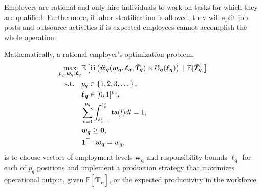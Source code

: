 \documentclass[hidelinks, nonatbib]{elsarticle}
\begin{document}
\begin{axiom}
    \label{era}
    Employers are rational and only hire individuals to work on tasks for which they are qualified. Furthermore, if labor stratification is allowed, they will split job posts and outsource activities if is expected employees cannot accomplish the whole operation.

    Mathematically, a rational employer's optimization problem,
    \begin{align}
        \max_{
            p_q,
            \boldsymbol{w_q},
            \boldsymbol{\ell_q}
        }
            &
            \mathbb{E}\left[
                \mho\left(
                    \boldsymbol{\ddot{w}_{q}}(
                        \boldsymbol{w_{q}},
                        \boldsymbol{\ell_{q}},
                        \boldsymbol{\tilde{T}_{q}}
                    )
                    \times
                    \boldsymbol{
                        \mho_q
                    }(
                        \boldsymbol{\ell_q}
                    )
                \right)
                \
                |
                \
                \mathbb{E}[
                    \boldsymbol{\tilde{T}_q}
                ]
            \right]
            \\
            \text{s.t.}
            \quad
            &
            p_q \in \left\{1, 2, 3, \dots\right\}
            ,
            \\
            &
            \boldsymbol{\ell_q} \in [0,1] ^ {p_q}
            ,
            \\
            &
            \sum_{v=1}^{p_q}{
                \int_{
                    \ell_{v-1}^{q}
                }^{
                    \ell_{v}^{q}
                }
                \text{ta}(l)dl
            }
            =
            1
            ,
            \\
            &
            \boldsymbol{w_{q}} \geq \boldsymbol{0}
            ,
            \\
            &
            \boldsymbol{1} ^ {\top}
            \cdot
            \boldsymbol{w_q}
            =
            w_q
            ,
    \end{align}
    is to choose vectors of employment levels $\boldsymbol{w_q}$ and responsibility bounds $\boldsymbol{\ell_q}$ for each of $p_q$ positions and implement a production strategy that maximizes operational output, given $\mathbb{E}[\boldsymbol{\tilde{T}_q}]$, or the expected productivity in the workforce.
\end{axiom}
\end{document}
